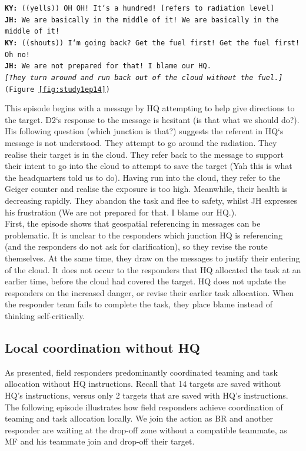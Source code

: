 \noindent\texttt{\textbf{KY:} ((yells)) OH OH! It`s a hundred! [refers to radiation level]\\
\textbf{JH:} We are basically in the middle of it! We are basically in the middle of it!\\
\textbf{KY:} ((shouts)) I`m going back? Get the fuel first! Get the fuel first! Oh no! \\
\textbf{JH:} We are not prepared for that! I blame our HQ.\\
\emph{ [They turn around and run back out of the cloud without the fuel.] }(Figure \ref{fig:study1ep14})\\
}

This episode begins with a message by HQ attempting to help give directions to the target. D2`s response to the message is hesitant (is that what we should do?). His following question (which junction is that?) suggests the referent in HQ`s message is not understood. They attempt to go around the radiation. They realise their target is in the cloud. They refer back to the message to support their intent to go into the cloud to attempt to save the target (Yah this is what the headquarters told us to do). Having run into the cloud, they refer to the Geiger counter and realise the exposure is too high. Meanwhile, their health is decreasing rapidly. They abandon the task and flee to safety, whilst JH expresses his frustration (We are not prepared for that. I blame our HQ.).\\

First, the episode shows that geospatial referencing in messages can be problematic. It is unclear to the responders which junction HQ is referencing (and the responders do not ask for clarification), so they revise the route themselves. At the same time, they draw on the messages to justify their entering of the cloud. It does not occur to the responders that HQ allocated the task at an earlier time, before the cloud had covered the target. HQ does not update the responders on the increased danger, or revise their earlier task allocation. When the responder team fails to complete the task, they place blame instead of thinking self-critically.\\

\subsection{Local coordination without HQ}\label{sec:s1localcoordination}
As presented, field responders predominantly coordinated teaming and task allocation without HQ instructions. Recall that 14 targets are saved without HQ's instructions, versus only 2 targets that are saved with HQ's instructions. The following episode illustrates how field responders achieve coordination of teaming and task allocation locally. We join the action as BR and another responder are waiting at the drop-off zone without a compatible teammate, as MF and his teammate join and drop-off their target.\\

